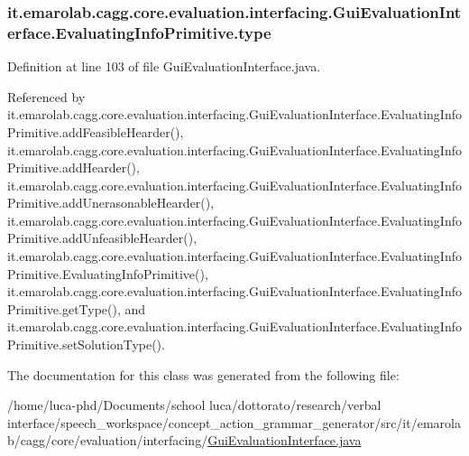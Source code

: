 \hypertarget{classit_1_1emarolab_1_1cagg_1_1core_1_1evaluation_1_1interfacing_1_1GuiEvaluationInterface_1_1EvaluatingInfoPrimitive_ade941c8c8ef34bec3348bc17d9073335}{
\subsubsection[{type}]{ it.\-emarolab.\-cagg.\-core.\-evaluation.\-interfacing.\-Gui\-Evaluation\-Interface.\-Evaluating\-Info\-Primitive.\-type\hspace{0.3cm}{\ttfamily [private]}}}\label{classit_1_1emarolab_1_1cagg_1_1core_1_1evaluation_1_1interfacing_1_1GuiEvaluationInterface_1_1EvaluatingInfoPrimitive_ade941c8c8ef34bec3348bc17d9073335}


Definition at line 103 of file Gui\-Evaluation\-Interface.\-java.



Referenced by it.\-emarolab.\-cagg.\-core.\-evaluation.\-interfacing.\-Gui\-Evaluation\-Interface.\-Evaluating\-Info\-Primitive.\-add\-Feasible\-Hearder(), it.\-emarolab.\-cagg.\-core.\-evaluation.\-interfacing.\-Gui\-Evaluation\-Interface.\-Evaluating\-Info\-Primitive.\-add\-Hearder(), it.\-emarolab.\-cagg.\-core.\-evaluation.\-interfacing.\-Gui\-Evaluation\-Interface.\-Evaluating\-Info\-Primitive.\-add\-Unerasonable\-Hearder(), it.\-emarolab.\-cagg.\-core.\-evaluation.\-interfacing.\-Gui\-Evaluation\-Interface.\-Evaluating\-Info\-Primitive.\-add\-Unfeasible\-Hearder(), it.\-emarolab.\-cagg.\-core.\-evaluation.\-interfacing.\-Gui\-Evaluation\-Interface.\-Evaluating\-Info\-Primitive.\-Evaluating\-Info\-Primitive(), it.\-emarolab.\-cagg.\-core.\-evaluation.\-interfacing.\-Gui\-Evaluation\-Interface.\-Evaluating\-Info\-Primitive.\-get\-Type(), and it.\-emarolab.\-cagg.\-core.\-evaluation.\-interfacing.\-Gui\-Evaluation\-Interface.\-Evaluating\-Info\-Primitive.\-set\-Solution\-Type().



The documentation for this class was generated from the following file\-:\begin{DoxyCompactItemize}
\item 
/home/luca-\/phd/\-Documents/school luca/dottorato/research/verbal interface/speech\-\_\-workspace/concept\-\_\-action\-\_\-grammar\-\_\-generator/src/it/emarolab/cagg/core/evaluation/interfacing/\hyperlink{GuiEvaluationInterface_8java}{Gui\-Evaluation\-Interface.\-java}\end{DoxyCompactItemize}
